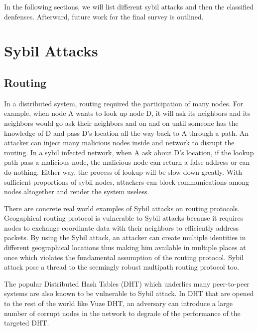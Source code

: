 \documentclass[conference]{IEEEtran}
\begin{document}
In the following sections, we will list different sybil attacks and then the classified denfenses. Afterward, future work for the final survey is outlined.

\section{Sybil Attacks}

\subsection{Routing}
In a distributed system, routing required the participation of many nodes. For example, when node A wants to look up node D, it will ask its neighbors and its neighbors would go ask their neighbors and on and on until someone has the knowledge of D and pass D’s location all the way back to A through a path. An attacker can inject many malicious nodes inside and network to disrupt the routing. In a sybil infected network, when A ask about D’s location, if the lookup path pass a malicious node, the malicious node can return a false address or can do nothing. Either way, the process of lookup will be slow down greatly. With sufficient proportions of sybil nodes, attackers can block communications among nodes altogether and render the system useless.

There are concrete real world examples of Sybil attacks on routing protocols.
Geogaphical routing protocol is vulnerable to Sybil attacks because it requires nodes to exchange coordinate data with their neighbors to efficiently address packets. By using the Sybil attack, an attacker can create multiple identities in different geographical locations thus making him available in multiple places at once which violates the fundamental assumption of the routing protocol\cite{Karlof03securerouting}. Sybil attack pose a thread to the seemingly robust multipath routing protocol too.\cite{Karlof03securerouting}

The popular Distributed Hash Tables (DHT) which underlies many peer-to-peer systems are also known to be vulnerable to Sybil attack. In DHT that are opened to the rest of the world like Vuze DHT, an adversary can introduce a large number of corrupt nodes in the network to degrade of the performance of the targeted DHT.\cite{Danezis05sybil-resistantdht} 
\end{document}
